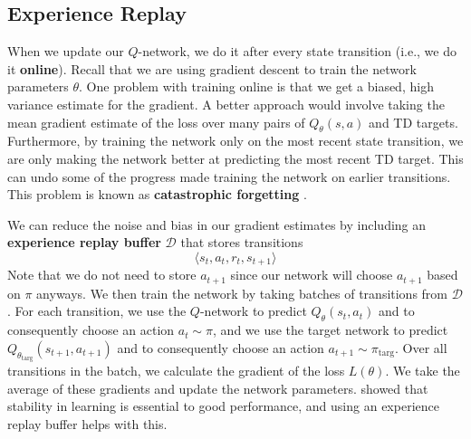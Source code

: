 \documentclass[journal, onecolumn, 12pt, draftclsnofoot]{IEEEtran}
\newcommand{\kword}[1]{\textbf{#1}}
\newcommand{\mc}[1]{\mathcal{#1}}
\begin{document}
		\subsection{Experience Replay}
		\par When we update our $Q$-network, we do it after every state transition (i.e., we do it \kword{online}). Recall that we are using gradient descent to train the network parameters $\theta$. One problem with training online is that we get a biased, high variance estimate for the gradient. A better approach would involve taking the mean gradient estimate of the loss over many pairs of $Q_\theta(s,a)$ and TD targets. Furthermore, by training the network only on the most recent state transition, we are only making the network better at predicting the most recent TD target. This can undo some of the progress made training the network on earlier transitions. This problem is known as \kword{catastrophic forgetting} \cite{dqn}.
		\par We can reduce the noise and bias in our gradient estimates by including an \kword{experience replay buffer} $\mc{D}$ that stores transitions
		$$\langle s_t, a_t, r_t, s_{t+1} \rangle$$
		Note that we do not need to store $a_{t+1}$ since our network will choose $a_{t+1}$ based on $\pi$ anyways. We then train the network by taking batches of transitions from $\mc{D}$. For each transition, we use the $Q$-network to predict $Q_\theta (s_t,a_t)$ and to consequently choose an action $a_t \sim \pi$, and we use the target network to predict $Q_{\theta_\text{targ}}(s_{t+1},a_{t+1})$ and to consequently choose an action $a_{t+1} \sim \pi_\text{targ}$. Over all transitions in the batch, we calculate the gradient of the loss $L(\theta)$. We take the average of these gradients and update the network parameters. \cite{dqn} showed that stability in learning is essential to good performance, and using an experience replay buffer helps with this.
\end{document}
